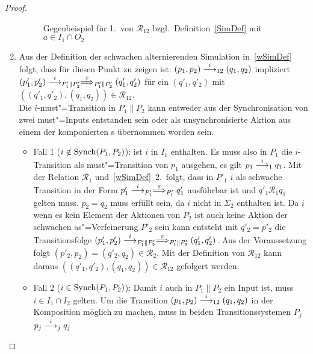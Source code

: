 \begin{proof}
\begin{enumerate}
\begin{figure}[htbp]
\begin{center}
        \caption{Gegenbeispiel für 1.\ von $\mathcal{R}_{12}$ bzgl.\
        Definition~\ref{SimDef} mit $a\in I_1\cap O_2$}
        \label{bsp1wSim}
      \end{center}
    \end{figure}

    \item Aus der Definition der schwachen alternierenden
      Simulation in~\ref{wSimDef} folgt, dass für diesen Punkt zu zeigen ist:
      $(p_1,p_2)\must[i]_{12}(q_1,q_2)$ impliziert $(p'_1,p'_2)
      \must[i]_{P'_1\|P'_2} \weakmust[\varepsilon]_{P'_1\|P'_2} (q'_1,q'_2)$
      für ein $(q'_1,q'_2)$ mit $((q'_1,q'_2),(q_1,q_2)) \in
      \mathcal{R}_{12}$.\\
      Die $i$-must"=Transition in $P_1\|P_2$ kann entweder aus der
      Synchronisation von zwei must"=Inputs entstanden sein oder als
      unsynchronisierte Aktion aus einem der komponierten \MEIO{}s übernommen
      worden sein.
      \begin{itemize}
        \item Fall 1 ($i\notin\mathrm{Synch} (P_1,P_2)$): \OBdA{} ist $i$ in $I_1$
          enthalten. Es muss also in $P_1$ die $i$-Transition als
          must"=Transition von $p_1$ ausgehen, es gilt $p_1\must[i]_1 q_1$. Mit
          der Relation $\mathcal{R}_1$ und~\ref{wSimDef}~2.\ folgt, dass in
          $P'_1$ $i$ als schwache Transition in der Form $p'_1\must[i]_{P'_1}
          \weakmust[\varepsilon]_{P'_1}q'_1$ ausführbar ist und $q'_1
          \mathcal{R}_1q_1$ gelten muss. $p_2=q_2$ muss erfüllt sein, da $i$
          nicht in $\Sigma _2$ enthalten ist. Da $i$ wenn es kein Element der
          Aktionen von $P_2$ ist auch keine Aktion der schwachen
          as"=Verfeinerung $P'_2$ sein kann entsteht mit $q'_2=p'_2$ die
          Transitionsfolge $(p'_1,p'_2) \must[i]_{P'_1\|P'_2}
          \weakmust[\varepsilon]_{P'_1\|P'_2} (q'_1,q'_2)$. Aus der
          Voraussetzung folgt $(p'_2,p_2) = (q'_2,q_2) \in \mathcal{R}_2$. Mit
          der Definition von $\mathcal{R}_{12}$ kann daraus
          $((q'_1,q'_2),(q_1,q_2)) \in \mathcal{R}_{12}$ gefolgert werden.
        \item Fall 2 ($i\in\mathrm{Synch} (P_1,P_2)$): Damit $i$ auch in $P_1\|P_2$
          ein Input ist, muss $i\in I_1\cap I_2$ gelten. Um die Transition
          $(p_1,p_2)\must[i]_{12}(q_1,q_2)$ in der Komposition möglich zu
          machen, muss in beiden Transitionssystemen $P_j$ $p_j\must[i]_j q_j$

\end{itemize}
\end{enumerate}
\end{proof}
